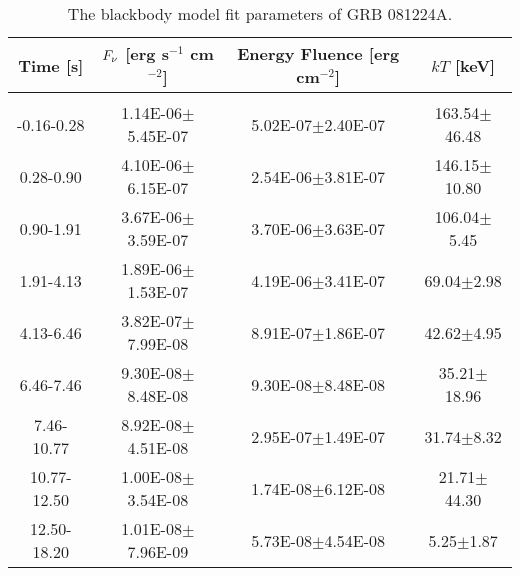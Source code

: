\begin{table}[h]
\centering
\scriptsize
\label{tab:}
\begin{tabular}{c| c c c}
Time [s] & $F_{\nu}$ [erg s$^{-1}$ cm$^{-2}$] & Energy Fluence [erg cm$^{-2}$] & $kT$ [keV] \\
\hline \hline\\ 

-0.16-0.28 & 1.14E-06$\pm$5.45E-07 & 5.02E-07$\pm$2.40E-07 & 163.54$\pm$46.48 \\ 

0.28-0.90 & 4.10E-06$\pm$6.15E-07 & 2.54E-06$\pm$3.81E-07 & 146.15$\pm$10.80 \\ 

0.90-1.91 & 3.67E-06$\pm$3.59E-07 & 3.70E-06$\pm$3.63E-07 & 106.04$\pm$5.45 \\ 

1.91-4.13 & 1.89E-06$\pm$1.53E-07 & 4.19E-06$\pm$3.41E-07 & 69.04$\pm$2.98 \\ 

4.13-6.46 & 3.82E-07$\pm$7.99E-08 & 8.91E-07$\pm$1.86E-07 & 42.62$\pm$4.95 \\ 

6.46-7.46 & 9.30E-08$\pm$8.48E-08 & 9.30E-08$\pm$8.48E-08 & 35.21$\pm$18.96 \\ 

7.46-10.77 & 8.92E-08$\pm$4.51E-08 & 2.95E-07$\pm$1.49E-07 & 31.74$\pm$8.32 \\ 

10.77-12.50 & 1.00E-08$\pm$3.54E-08 & 1.74E-08$\pm$6.12E-08 & 21.71$\pm$44.30 \\ 

12.50-18.20 & 1.01E-08$\pm$7.96E-09 & 5.73E-08$\pm$4.54E-08 & 5.25$\pm$1.87 \\ 

\end{tabular}
\caption{The blackbody model fit parameters of GRB 081224A.}
\end{table}

